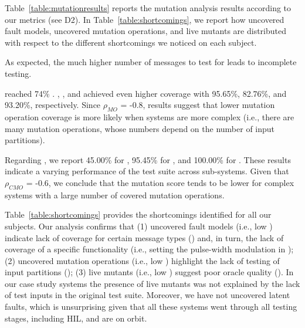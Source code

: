 



Table~\ref{table:mutationresults} reports the mutation analysis results according to our metrics (see D2).
In Table~\ref{table:shortcomings}, we report how uncovered fault models, uncovered mutation operations, and live mutants are distributed with respect to the different shortcomings we noticed on each subject.

As expected, the much higher number of messages to test for \ADCS leads to incomplete testing. 

\ADCS reached 74\% .  \GPS, \PDHU, and \PARAM  achieved even higher coverage with 95.65\%, 82.76\%, and 93.20\%,  respectively. Since 
$\rho_{MO}$ = -0.8, results suggest that lower mutation operation coverage is more likely when systems are more complex (i.e., there are many mutation operations, whose numbers depend on the number of input partitions). 

Regarding , we report 45.00\% for \ADCS,  95.45\% for \GPS,  and 100.00\% for \PDHU. These results indicate a varying performance of the \SVF test suite across sub-systems.
Given that 
$\rho_{CMO}$ = -0.6, 
we conclude that the mutation score tends to be lower for complex systems with a large number of covered mutation operations.

Table~\ref{table:shortcomings} provides the shortcomings identified for all our subjects. 
Our analysis confirms that (1) uncovered fault models (i.e., low ) indicate lack of coverage for certain message types () and, in turn, the lack of coverage of a specific functionality (i.e., setting the pulse-width modulation in \ADCS); (2) uncovered mutation operations (i.e., low ) highlight the lack of testing of input partitions (); (3) live mutants (i.e., low ) suggest poor oracle quality (). In our case study systems the presence of live mutants was not explained by the lack of test inputs in the original test suite. Moreover, we have not uncovered latent faults, which is unsurprising given that all these systems went through all testing stages, including HIL, and are on orbit. 

